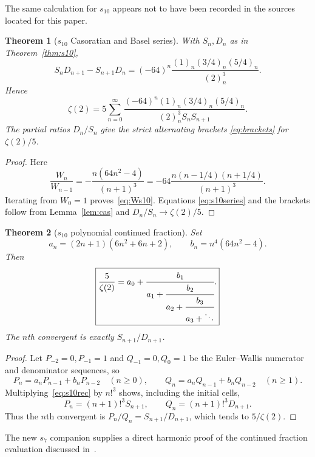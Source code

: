\documentclass[11pt,reqno]{amsart}
\newtheorem{theorem}{Theorem}[section]
\theoremstyle{definition}
\theoremstyle{remark}
\begin{document}
The same calculation for $s_{10}$ appears not to have been recorded in the
sources located for this paper.

\begin{theorem}[$s_{10}$ Casoratian and Basel series]\label{thm:s10cas}
With $S_n,D_n$ as in Theorem~\ref{thm:s10},
\begin{equation}\label{eq:Ws10}
 S_nD_{n+1}-S_{n+1}D_n
 =(-64)^n\frac{(1)_n(3/4)_n(5/4)_n}{(2)_n^3}.
\end{equation}
Hence
\begin{equation}\label{eq:s10series}
 \boxed{\displaystyle
 \zeta(2)=5\sum_{n=0}^{\infty}
 \frac{(-64)^n(1)_n(3/4)_n(5/4)_n}
 {(2)_n^3S_nS_{n+1}}.}
\end{equation}
The partial ratios $D_n/S_n$ give the strict alternating brackets
\eqref{eq:brackets} for $\zeta(2)/5$.
\end{theorem}

\begin{proof}
Here
\[
 \frac{W_n}{W_{n-1}}
 =-\frac{n(64n^2-4)}{(n+1)^3}
 =-64\frac{n(n-1/4)(n+1/4)}{(n+1)^3}.
\]
Iterating from $W_0=1$ proves~\eqref{eq:Ws10}.  Equations
\eqref{eq:s10series} and the brackets follow from Lemma~\ref{lem:cas} and
$D_n/S_n\to\zeta(2)/5$.
\end{proof}

\begin{theorem}[$s_{10}$ polynomial continued fraction]\label{thm:s10cf}
Set
\[
 a_n=(2n+1)(6n^2+6n+2),\qquad
 b_n=n^4(64n^2-4).
\]
Then
\begin{equation}\label{eq:s10cf}
 \boxed{\displaystyle
 \frac5{\zeta(2)}
 =a_0+\cfrac{b_1}{a_1+\cfrac{b_2}{a_2+
             \cfrac{b_3}{a_3+\ddots}}}.}
\end{equation}
The $n$th convergent is exactly $S_{n+1}/D_{n+1}$.
\end{theorem}

\begin{proof}
Let $P_{-2}=0,P_{-1}=1$ and $Q_{-1}=0,Q_0=1$ be the Euler--Wallis numerator
and denominator sequences, so
\[
 P_n=a_nP_{n-1}+b_nP_{n-2}\quad(n\geq0),\qquad
 Q_n=a_nQ_{n-1}+b_nQ_{n-2}\quad(n\geq1).
\]
Multiplying~\eqref{eq:s10rec} by $n!^3$ shows, including the initial cells,
\[
 P_n=(n+1)!^3S_{n+1},\qquad Q_n=(n+1)!^3D_{n+1}.
\]
Thus the $n$th convergent is $P_n/Q_n=S_{n+1}/D_{n+1}$, which tends to
$5/\zeta(2)$.
\end{proof}

The new $s_7$ companion supplies a direct harmonic proof of the continued
fraction evaluation discussed in~\cite{MOCooper}.
\end{document}

